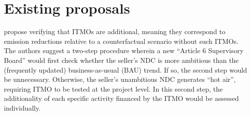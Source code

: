 \documentclass[12pt,english]{article}
\begin{document}


\section{Existing proposals\label{subsec:existing}}
\cite{michaelowa_additionality_2019} propose verifying that ITMOs are additional, meaning they correspond to emission reductions relative to a counterfactual scenario without such ITMOs. The authors suggest a two-step procedure wherein a new ``Article 6 Supervisory Board'' would first check whether the seller's NDC is more ambitious than the (frequently updated) business-as-usual (BAU) trend. %
If so, the second step would be unnecessary. Otherwise, the seller's unambitious NDC generates ``hot air'', requiring ITMO to be tested at the project level. In this second step, the additionality of each specific activity financed by the ITMO would be assessed individually. 
\end{document}
